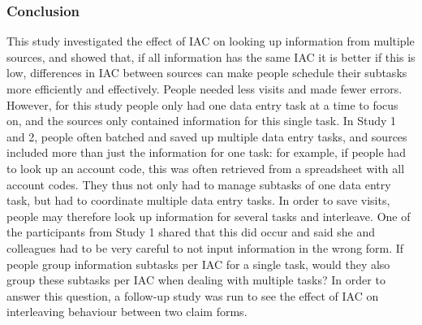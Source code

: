 \begin{table}
\begin{itemize}

%

\subsubsection{Conclusion}
This study investigated the effect of IAC on looking up information from multiple sources, and showed that, if all information has the same IAC it is better if this is low, differences in IAC between sources can make people schedule their subtasks more efficiently and effectively. People needed less visits and made fewer errors. 
However, for this study people only had one data entry task at a time to focus on, and the sources only contained information for this single task. In Study 1 and 2, people often batched and saved up multiple data entry tasks, and sources included more than just the information for one task: for example, if people had to look up an account code, this was often retrieved from a spreadsheet with all account codes. They thus not only had to manage subtasks of one data entry task, but had to coordinate multiple data entry tasks. In order to save visits, people may therefore look up information for several tasks and interleave. One of the participants from Study 1 shared that this did occur and said she and colleagues had to be very careful to not input information in the wrong form. If people group information subtasks per IAC for a single task, would they also group these subtasks per IAC when dealing with multiple tasks? In order to answer this question, a follow-up study was run to see the effect of IAC on interleaving behaviour between two claim forms. 



\end{itemize}
\end{table}
